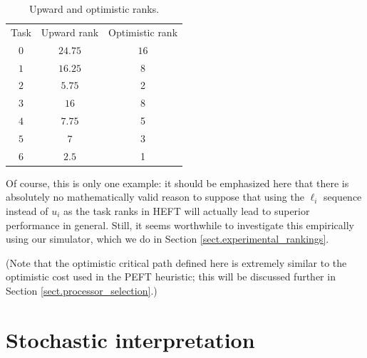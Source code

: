 \documentclass[12pt]{article}
\begin{document}
\begin{table}
	\caption{Upward and optimistic ranks.} 
	\begin{center}	
		\begin{tabular}{c c c}
			\cmidrule{1-3}
			Task & Upward rank & Optimistic rank\\
			\cmidrule{1-3}
			$0$ & $24.75$ & $16$ \\
			$1$ & $16.25$ & 8 \\
			$2$ & $5.75$ & 2 \\
			$3$ & $16$ & 8 \\
			$4$ & $7.75$ & 5 \\
			$5$ & $7$ & 3 \\
			$6$ & $2.5$ & 1 \\
			\bottomrule
		\end{tabular}
		\label{tb.opt_example}
	\end{center}	
\end{table}

Of course, this is only one example: it should be emphasized here that there is absolutely no mathematically valid reason to suppose that using the $\ell_i$ sequence instead of $u_i$ as the task ranks in HEFT will actually lead to superior performance in general. Still, it seems worthwhile to investigate this empirically using our simulator, which we do in Section \ref{sect.experimental_rankings}. 


(Note that the optimistic critical path defined here is extremely similar to the optimistic cost used in the PEFT heuristic; this will be discussed further in Section \ref{sect.processor_selection}.)


\section{Stochastic interpretation}
\label{sect.alt_rankings}
\end{document}
